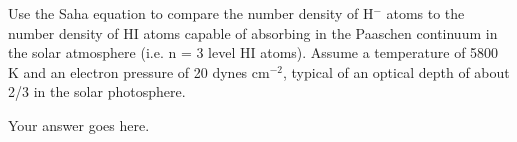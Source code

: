 \documentclass[12pt]{article}
\newenvironment{problem}[2][Problem]{\begin{trivlist}
\item[\hskip \labelsep {\bfseries #1}\hskip \labelsep {\bfseries #2.}]}{\end{trivlist}}
\newenvironment{answer}[2][Answer]{\begin{trivlist}
\item[\hskip \labelsep {\bfseries #1}\hskip \labelsep {\bfseries #2.}]}{\end{trivlist}}
\begin{document}
\begin{problem}{4}
Use the Saha equation to compare the number density of H$^-$ atoms to the number density of HI atoms capable of absorbing in the Paaschen continuum in the solar atmosphere (i.e. n = 3 level HI atoms). Assume a temperature of 5800 K and an electron pressure of 20 dynes cm$^{-2}$, typical of an optical depth of about 2/3 in the solar photosphere.
\end{problem}

\begin{answer}{4}
Your answer goes here.
\end{answer}
\end{document}
